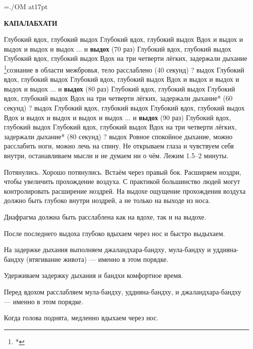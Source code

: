 \pdfhorigin=15mm \hsize=180mm
\pdfvorigin=15mm \vsize=267mm
\nopagenumbers
\font\OM=./OM at17pt
\parindent=0pt
\parskip=7pt
\centerline{\bf КАПАЛАБХАТИ}
\begingroup
\obeylines
Глубокий вдох, глубокий выдох
Глубокий вдох, глубокий выдох
Вдох и выдох и выдох и выдох и выдох $\ldots$ и {\bf выдох} (70 раз)
Глубокий вдох, глубокий выдох
Глубокий вдох, глубокий выдох
Вдох на три четверти лёгких, задержали дыхание%
  \footnote{*}{сознание в области межбровья, тело расслаблено} (40 секунд)
{\OM?} выдох
Глубокий вдох, глубокий выдох
Глубокий вдох, глубокий выдох
Вдох и выдох и выдох и выдох и выдох $\ldots$ и {\bf выдох} (80 раз)
Глубокий вдох, глубокий выдох
Глубокий вдох, глубокий выдох
Вдох на три четверти лёгких, задержали дыхание* (60 секунд)
{\OM?} выдох
Глубокий вдох, глубокий выдох
Глубокий вдох, глубокий выдох
Вдох и выдох и выдох и выдох и выдох $\ldots$ и {\bf выдох} (90 раз)
Глубокий вдох, глубокий выдох
Глубокий вдох, глубокий выдох
Вдох на три четверти лёгких, задержали дыхание* (80 секунд)
{\OM?} выдох
\endgroup
Ровное спокойное дыхание, можно расслабить ноги, можно лечь на спину.
Не открываем глаза и чувствуем себя внутри, останавливаем мысли и не думаем ни о чём.
Лежим 1.5--2 минуты. \par
Потянулись. Хорошо потянулись. Встаём через правый бок.
\vfil\eject
\parskip=0pt
Расширяем ноздри, чтобы увеличить прохождение воздуха. С практикой большинство людей могут
контролировать расширение ноздрей. На выдохе ощущение прохождения воздуха должно быть глубоко
внутри ноздрей, а не только на выходе из носа.

Диафрагма должна быть расслаблена как на вдохе, так и на выдохе.

После последнего выдоха глубоко вдыхаем через нос и быстро выдыхаем.

На задержке дыхания выполняем джаландхара-бандху, мула-бандху и уддияна-бандху
(втягивание живота) --- именно в этом порядке.

Удерживаем задержку дыхания и бандхи комфортное время.

Перед вдохом расслабляем мула-бандху, уддияна-бандху, и джаландха\-ра-бандху --- именно в
этом порядке.

Когда голова поднята, медленно вдыхаем через нос.

\bye
